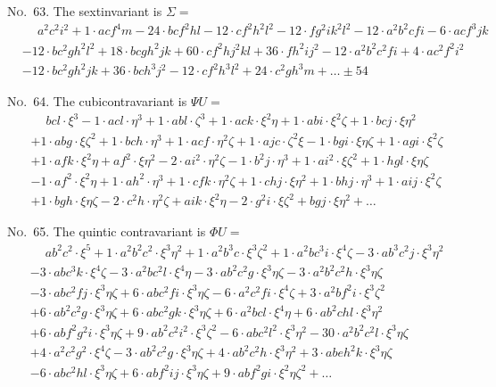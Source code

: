\documentclass[11pt,a4paper]{book}
\begin{document}
\begin{center}
\noindent\textsc{No.~63.} The sextinvariant is $\Sigma =$
\begin{align*}
&\phantom{+} a^2c^2i^2 + 1\cdot acf^4m - 24\cdot bcf^2hl - 12\cdot cf^2h^2l^2 - 12\cdot fg^2ik^2l^2 - 12\cdot a^2b^2cfi - 6\cdot acf^3jk\\
& - 12\cdot bc^2gh^2l^2 + 18\cdot bcgh^2jk + 60\cdot cf^2hj^2kl + 36\cdot fh^2ij^2 - 12\cdot a^2b^2c^2fi + 4\cdot ac^2f^2i^2\\
& - 12\cdot bc^2gh^2jk + 36\cdot bch^3j^2 - 12\cdot cf^2h^3l^2 + 24\cdot c^2gh^3m + \ldots \pm 54
\end{align*}

\noindent\textsc{No.~64.} The cubicontravariant is $\Psi U =$
\begin{align*}
&\phantom{+} bcl\cdot\xi^3 - 1\cdot acl\cdot\eta^3 + 1\cdot abl\cdot\zeta^3 + 1\cdot ack\cdot\xi^2\eta + 1\cdot abi\cdot\xi^2\zeta + 1\cdot bcj\cdot\xi\eta^2\\
& + 1\cdot abg\cdot\xi\zeta^2 + 1\cdot bch\cdot\eta^3 + 1\cdot acf\cdot\eta^2\zeta + 1\cdot ajc\cdot\zeta^2\xi - 1\cdot bgi\cdot\xi\eta\zeta + 1\cdot agi\cdot\xi^2\zeta\\
& + 1\cdot afk\cdot\xi^2\eta + af^2\cdot\xi\eta^2 - 2\cdot ai^2\cdot\eta^2\zeta - 1\cdot b^2j\cdot\eta^3 + 1\cdot ai^2\cdot\xi\zeta^2 + 1\cdot hgl\cdot\xi\eta\zeta\\
& - 1\cdot af^2\cdot\xi^2\eta + 1\cdot ah^2\cdot\eta^3 + 1\cdot cfk\cdot\eta^2\zeta + 1\cdot chj\cdot\xi\eta^2 + 1\cdot bhj\cdot\eta^3 + 1\cdot aij\cdot\xi^2\zeta\\
& + 1\cdot bgh\cdot\xi\eta\zeta - 2\cdot c^2h\cdot\eta^2\zeta + aik\cdot\xi^2\eta - 2\cdot g^2i\cdot\xi\zeta^2 + bgj\cdot\xi\eta^2 + \ldots
\end{align*}

\noindent\textsc{No.~65.} The quintic contravariant is $\Phi U =$
\begin{align*}
&\phantom{+} ab^2c^2\cdot\xi^5 + 1\cdot a^2b^2c^2\cdot\xi^3\eta^2 + 1\cdot a^2b^3c\cdot\xi^3\zeta^2 + 1\cdot a^2bc^3i\cdot\xi^4\zeta - 3\cdot ab^3c^2j\cdot\xi^3\eta^2\\
& - 3\cdot abc^3k\cdot\xi^4\zeta - 3\cdot a^2bc^2l\cdot\xi^4\eta - 3\cdot ab^2c^2g\cdot\xi^3\eta\zeta - 3\cdot a^2b^2c^2h\cdot\xi^3\eta\zeta\\
& - 3\cdot abc^2fj\cdot\xi^3\eta\zeta + 6\cdot abc^2fi\cdot\xi^3\eta\zeta - 6\cdot a^2c^2fi\cdot\xi^4\zeta + 3\cdot a^2bf^2i\cdot\xi^3\zeta^2\\
& + 6\cdot ab^2c^2g\cdot\xi^3\eta\zeta + 6\cdot abc^2gk\cdot\xi^3\eta\zeta + 6\cdot a^2bcl\cdot\xi^4\eta + 6\cdot ab^2chl\cdot\xi^3\eta^2\\
& + 6\cdot abf^2g^2i\cdot\xi^3\eta\zeta + 9\cdot ab^2c^2i^2\cdot\xi^3\zeta^2 - 6\cdot abc^2l^2\cdot\xi^3\eta^2 - 30\cdot a^2b^2c^2l\cdot\xi^3\eta\zeta\\
& + 4\cdot a^2c^2g^2\cdot\xi^4\zeta - 3\cdot ab^2c^2g\cdot\xi^3\eta\zeta + 4\cdot ab^2c^2h\cdot\xi^3\eta^2 + 3\cdot abeh^2k\cdot\xi^3\eta\zeta\\
& - 6\cdot abc^2hl\cdot\xi^3\eta\zeta + 6\cdot abf^2ij\cdot\xi^3\eta\zeta + 9\cdot abf^2gi\cdot\xi^2\eta\zeta^2 + \ldots
\end{align*}


\end{center}
\end{document}
